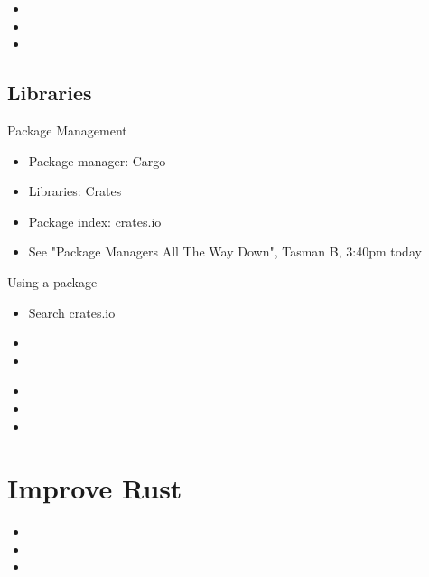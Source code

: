 \documentclass[xcolor={svgnames},hyperref]{beamer}
\begin{document}
    \begin{frame}
        \begin{itemize}
            \item
            \item
            \item
        \end{itemize}
    \end{frame}




\subsection{Libraries }

    \begin{frame}
        Package Management
        \begin{itemize}
            \item Package manager: Cargo
            \item Libraries: Crates
            \item Package index: crates.io
            \item See "Package Managers All The Way Down", Tasman B, 3:40pm today
        \end{itemize}
    \end{frame}

    \begin{frame}
        Using a package
        \begin{itemize}
            \item Search crates.io
            \item
            \item
        \end{itemize}
    \end{frame}



    \begin{frame}
        \begin{itemize}
            \item
            \item
            \item
        \end{itemize}
    \end{frame}


\section{Improve Rust}



    \begin{frame}
        \begin{itemize}
            \item
            \item
            \item
        \end{itemize}
    \end{frame}
\end{document}
